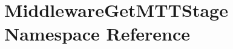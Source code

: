 \hypertarget{namespaceMiddlewareGetMTTStage}{\section{Middleware\-Get\-M\-T\-T\-Stage Namespace Reference}
\label{namespaceMiddlewareGetMTTStage}
}
